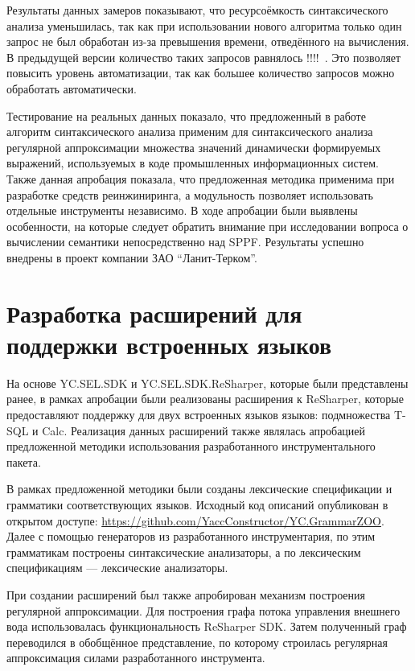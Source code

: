 Результаты данных замеров показывают, что ресурсоёмкость синтаксического анализа уменьшилась, так как при использовании нового алгоритма только один запрос не был обработан из-за превышения времени, отведённого на вычисления. В предыдущей версии количество таких запросов равнялось !!!!~\cite{Syrcose}. Это позволяет повысить уровень автоматизации, так как большее количество запросов можно обработать автоматически.

Тестирование на реальных данных показало, что предложенный в работе алгоритм синтаксического анализа применим для синтаксического анализа регулярной аппроксимации множества значений динамически формируемых выражений, используемых в коде промышленных информационных систем. Также данная апробация показала, что предложенная методика применима при разработке средств реинжиниринга, а модульность позволяет использовать отдельные инструменты независимо. В ходе апробации были выявлены особенности, на которые следует обратить внимание при исследовании вопроса о вычислении семантики непосредственно над SPPF. Результаты успешно внедрены в проект компании ЗАО ``Ланит-Терком''.


\section{Разработка расширений для поддержки встроенных языков}

На основе YC.SEL.SDK и YC.SEL.SDK.ReSharper, которые были представлены ранее, в рамках апробации были реализованы расширения к ReSharper, которые предоставляют поддержку для  двух встроенных языков языков: подмножества T-SQL и Calc. Реализация данных расширений также являлась апробацией предложенной методики использования разработанного инструментального пакета.

В рамках предложенной методики были созданы лексические спецификации и грамматики соответствующих языков. Исходный код описаний опубликован в открытом доступе: \url{https://github.com/YaccConstructor/YC.GrammarZOO}. Далее с помощью генераторов из разработанного инструментария, по этим грамматикам построены синтаксические анализаторы, а по лексическим спецификациям --- лексические анализаторы.

При создании расширений был также апробирован механизм построения регулярной аппроксимации. Для построения графа потока управления внешнего вода использовалась функциональность ReSharper SDK. Затем полученный граф переводился в обобщённое представление, по которому строилась регулярная аппроксимация силами разработанного инструмента.

